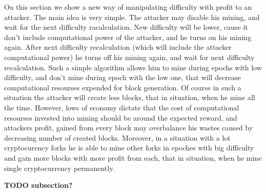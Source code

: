 \documentclass[number,preprint,review]{elsarticle}
\begin{document}
On this section we show a new way of manipulating difficulty with profit to an attacker.
The main idea is very simple.
The attacker may disable his mining, and wait for the next difficulty racalculation.
New difficulty will be lower, cause it don't include computational power of the attacker, and he turns on his mining again.
After next difficulty recalculation (which will include the attacker computational power) he turns off his mining again, and wait for next difficulty recalculation.
Such a simple algorithm allows him to mine during epochs with low difficulty, and don't mine during epoch with the low one, that will decrease computational resourses expended for block generation.
Of course in such a situation the attacker will create less blocks, that in situation, when he mine all the time.
However, lows of economy dictate that the cost of computational resourses invested into mining should be around the expected reward, and attackers profit, gained from every block may overbalance his wastes caused by decreasing number of created blocks.
Moreover, in a situation with a lot cryptocurency forks he is able to mine other forks in epoches with big difficulty and gain more blocks with more profit from each, that in situation, when he mine single cryptocurrency permanently.

 \textbf{TODO subsection?}
\end{document}
